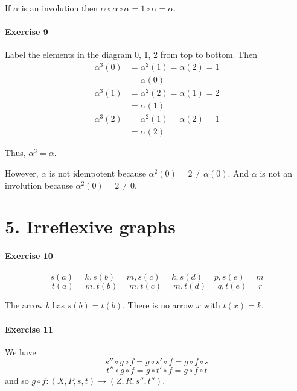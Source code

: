 \documentclass{report}
\begin{document}
    If $\alpha$ is an involution then $\alpha \circ \alpha \circ \alpha = 1 \circ \alpha = \alpha$.

    \paragraph{Exercise 9}
    Label the elements in the diagram 0, 1, 2 from top to bottom. Then
    \begin{align*}
        \alpha^3(0) & = \alpha^2(1) = \alpha(2) = 1 \\
        & = \alpha(0) \\
        \alpha^3(1) & = \alpha^2(2) = \alpha(1) = 2 \\
        & = \alpha(1) \\
        \alpha^3(2) & = \alpha^2(1) = \alpha(2) = 1 \\
        & = \alpha(2)
    \end{align*}

    Thus, $\alpha^3 = \alpha$.

    However, $\alpha$ is not idempotent because $\alpha^2(0) = 2 \neq \alpha(0)$. And $\alpha$ is not an involution
    because $\alpha^2(0) = 2 \neq 0$.

    \section{5. Irreflexive graphs}

    \paragraph{Exercise 10}
    \[ s(a) = k, s(b) = m, s(c) = k, s(d) = p, s(e) = m \]
    \[ t(a) = m, t(b) = m, t(c) = m, t(d) = q, t(e) = r \]

    The arrow $b$ has $s(b) = t(b)$. There is no arrow $x$ with $t(x) = k$.

    \paragraph{Exercise 11}
    We have
    \[ s'' \circ g \circ f = g \circ s' \circ f = g \circ f \circ s \]
    \[ t'' \circ g \circ f = g \circ t' \circ f = g \circ f \circ t \]
    and so $g \circ f : (X,P,s,t) \rightarrow (Z,R,s'',t'')$.
\end{document}

